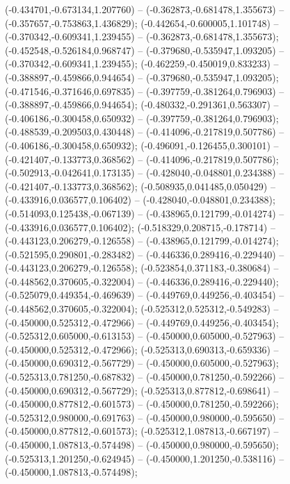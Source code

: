  (-0.434701,-0.673134,1.207760) -- (-0.362873,-0.681478,1.355673) -- (-0.357657,-0.753863,1.436829);
 (-0.442654,-0.600005,1.101748) -- (-0.370342,-0.609341,1.239455) -- (-0.362873,-0.681478,1.355673);
 (-0.452548,-0.526184,0.968747) -- (-0.379680,-0.535947,1.093205) -- (-0.370342,-0.609341,1.239455);
 (-0.462259,-0.450019,0.833233) -- (-0.388897,-0.459866,0.944654) -- (-0.379680,-0.535947,1.093205);
 (-0.471546,-0.371646,0.697835) -- (-0.397759,-0.381264,0.796903) -- (-0.388897,-0.459866,0.944654);
 (-0.480332,-0.291361,0.563307) -- (-0.406186,-0.300458,0.650932) -- (-0.397759,-0.381264,0.796903);
 (-0.488539,-0.209503,0.430448) -- (-0.414096,-0.217819,0.507786) -- (-0.406186,-0.300458,0.650932);
 (-0.496091,-0.126455,0.300101) -- (-0.421407,-0.133773,0.368562) -- (-0.414096,-0.217819,0.507786);
 (-0.502913,-0.042641,0.173135) -- (-0.428040,-0.048801,0.234388) -- (-0.421407,-0.133773,0.368562);
 (-0.508935,0.041485,0.050429) -- (-0.433916,0.036577,0.106402) -- (-0.428040,-0.048801,0.234388);
 (-0.514093,0.125438,-0.067139) -- (-0.438965,0.121799,-0.014274) -- (-0.433916,0.036577,0.106402);
 (-0.518329,0.208715,-0.178714) -- (-0.443123,0.206279,-0.126558) -- (-0.438965,0.121799,-0.014274);
 (-0.521595,0.290801,-0.283482) -- (-0.446336,0.289416,-0.229440) -- (-0.443123,0.206279,-0.126558);
 (-0.523854,0.371183,-0.380684) -- (-0.448562,0.370605,-0.322004) -- (-0.446336,0.289416,-0.229440);
 (-0.525079,0.449354,-0.469639) -- (-0.449769,0.449256,-0.403454) -- (-0.448562,0.370605,-0.322004);
 (-0.525312,0.525312,-0.549283) -- (-0.450000,0.525312,-0.472966) -- (-0.449769,0.449256,-0.403454);
 (-0.525312,0.605000,-0.613153) -- (-0.450000,0.605000,-0.527963) -- (-0.450000,0.525312,-0.472966);
 (-0.525313,0.690313,-0.659336) -- (-0.450000,0.690312,-0.567729) -- (-0.450000,0.605000,-0.527963);
 (-0.525313,0.781250,-0.687832) -- (-0.450000,0.781250,-0.592266) -- (-0.450000,0.690312,-0.567729);
 (-0.525313,0.877812,-0.698641) -- (-0.450000,0.877812,-0.601573) -- (-0.450000,0.781250,-0.592266);
 (-0.525312,0.980000,-0.691763) -- (-0.450000,0.980000,-0.595650) -- (-0.450000,0.877812,-0.601573);
 (-0.525312,1.087813,-0.667197) -- (-0.450000,1.087813,-0.574498) -- (-0.450000,0.980000,-0.595650);
 (-0.525313,1.201250,-0.624945) -- (-0.450000,1.201250,-0.538116) -- (-0.450000,1.087813,-0.574498);
